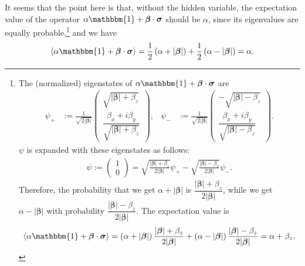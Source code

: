 \documentclass[12pt]{article}
\begin{document}
It seems that the point here is that, without the hidden variable, the expectation value of the operator $\alpha \mathbbm{1} + \bm{\beta} \cdot \bm{\sigma}$ should be $\alpha$, since its eigenvalues are equally probable,\footnote{The (normalized) eigenstates of $\alpha \mathbbm{1} +\boldsymbol{\beta}\cdot\boldsymbol{\sigma}$ are
\begin{align*}
  \psi_{+}
  &:= \frac{1}{\sqrt{2|\bm{\beta}|}}
  \begin{pmatrix}
    \sqrt{|\bm{\beta}|+\beta_z}\\
    \dfrac{\beta_x+i\beta_y}{\sqrt{|\bm{\beta}|+\beta_z}}
  \end{pmatrix},
  &
  \psi_{-}
  &:= \frac{1}{\sqrt{2|\bm{\beta}|}}
  \begin{pmatrix}
    -\sqrt{|\bm{\beta}|-\beta_z}\\
    \dfrac{\beta_x+i\beta_y}{\sqrt{|\bm{\beta}|-\beta_z}}
  \end{pmatrix}.
\end{align*}
$\psi$ is expanded with these eigenstates as follows:
\begin{align*}
  \psi
  :=
  \begin{pmatrix}
    1\\
    0
  \end{pmatrix}
  = \sqrt{\frac{|\bm{\beta}|+\beta_z}{2|\bm{\beta}|}}\psi_{+} - \sqrt{\frac{|\bm{\beta}|-\beta_z}{2|\bm{\beta}|}}\psi_{-}.
\end{align*}
Therefore, the probability that we get $\alpha+|\bm{\beta}|$ is $\dfrac{|\bm{\beta}|+\beta_z}{2|\bm{\beta}|}$, while we get $\alpha-|\bm{\beta}|$ with probability $\dfrac{|\bm{\beta}|-\beta_z}{2|\bm{\beta}|}$.
The expectation value is
\begin{align*}
  \langle \alpha \mathbbm{1} + \bm{\beta} \cdot \bm{\sigma} \rangle
  = \left( \alpha+|\bm{\beta}| \right) \dfrac{|\bm{\beta}|+\beta_z}{2|\bm{\beta}|} + \left( \alpha-|\bm{\beta}| \right) \dfrac{|\bm{\beta}|-\beta_z}{2|\bm{\beta}|}
  = \alpha + \beta_z.
\end{align*}
} 
and we have 
\begin{displaymath}
  \langle \alpha \mathbbm{1} + \bm{\beta} \cdot \bm{\sigma} \rangle
  = \frac{1}{2} \left( \alpha + |\bm{\beta}| \right) + \frac{1}{2} \left( \alpha - |\bm{\beta}| \right)
  = \alpha.
\end{displaymath}
\end{document}
